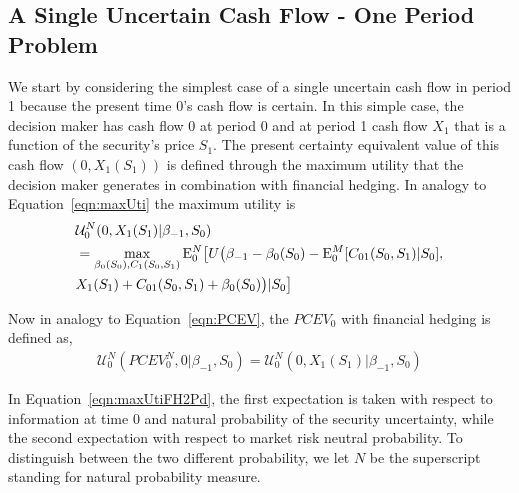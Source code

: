 \documentclass{article}[12pt letter]
\newtheorem{lemma}[theorem]{Lemma}
\newcommand{\E}{\mathrm{E}}
\begin{document}
\subsection{A Single Uncertain Cash Flow - One Period Problem}
We start by considering the simplest case of a single uncertain cash flow in period 1 because the present time 0's cash flow is certain. In this simple case, the decision maker has cash flow 0 at period 0 and  at period 1 cash flow $X_1$ that is a function of the security's price $S_1$. The present certainty equivalent value of this cash flow $(0, X_1(S_1))$ is defined through the maximum utility that the decision maker generates in combination with financial hedging. In analogy to Equation~\ref{eqn:maxUti} the maximum utility is
\begin{align} \label{eqn:maxUtiFH2Pd}
    &\mathcal{U}^N_0(0, X_{1}(S_1)|\beta_{-1},S_0) \nonumber \\
    & = \max_{\beta_0(S_0), C_1(S_0,S_1)} \E_0^N \big{[}U\big{(}\beta_{-1}-\beta_0(S_0)-\E_0^M[C_{01}(S_0,S_1)|S_0],  \nonumber \\ & X_1(S_1)+ C_{01}(S_0,S_1) + \beta_{0}(S_0)\big{)}|S_0 \big{]}
\end{align}

Now in analogy to Equation~\ref{eqn:PCEV}, the $PCEV_0$ with financial hedging is defined as,
\begin{align} \label{eqn:PCEV-FH2Period}
\mathcal{U}^N_0(PCEV_0^N, 0|\beta_{-1},S_0) = \mathcal{U}^N_0(0, X_1(S_1) |\beta_{-1},S_0)
\end{align}

In Equation~\ref{eqn:maxUtiFH2Pd}, the first expectation is taken with respect to information at time 0 and natural probability of the security uncertainty, while the second expectation with respect to market risk neutral probability. To distinguish between the two different probability, we let $N$ be the superscript standing for natural probability measure. 
%
%
\end{document}
